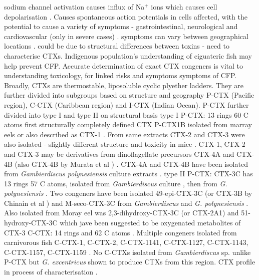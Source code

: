 \documentclass[12pt]{article}
\begin{document}
sodium channel activation causes influx of Na$^{+}$ ions which causes cell depolarisation \cite{mattei1999neurotoxins,lewis1992action,molgo2000ciguatera}.
Causes spontaneous action potentials in cells affected, with the potential to cause a variety of symptoms - gastrointestinal, neurological and cardiovascular (only in severe cases) \cite{sims1987theoretical}.
symptoms can vary between geographical locations \cite{molgo2000ciguatera,dickey2010ciguatera}. could be due to structural differences between toxins - need to characterise CTXs. Indigenous population's understanding of ciguateric fish may help prevent CFP. Accurate determination of exact CTX congeners is vital to understanding toxicology, for linked risks and symptoms symptoms of CFP.
Broadly, CTXs are thermostable, liposoluble cyclic plyether ladders. They are further divided into subgroups based on structure and geography P-CTX (Pacific region), C-CTX (Caribbean region) and I-CTX (Indian Ocean). P-CTX further divided into type I and type II on structural basis %
type I P-CTX: 13 rings 60 C atoms \cite{murata1990structures,lewis1991purification,lewis1993origin} first structurally completely defined CTX P-CTX1B isolated from marray eels \cite{murata1990structures} or also described as CTX-1 \cite{lewis1991purification}. From same extracts CTX-2 and CTX-3 were also isolated - slightly different structure and toxicity in mice \cite{lewis1991purification}. CTX-1, CTX-2 and CTX-3 may be derivatives from dinoflagellate precursors CTX-4A and CTX-4B (also GTX-4B by Murata et al \cite{murata1990structures}) \cite{lewis1993origin,yasumoto2000structural}. CTX-4A and CTX-4B have been isolated from \emph{Gambierdiscus polynesiensis} culture extracts \cite{chinain2010growth}.
type II P-CTX: CTX-3C has 13 rings 57 C atoms, isolated from \emph{Gambierdiscus} culture \cite{satake1993structure}, then from \emph{G. polynesiensis} \cite{chinain2010growth}. Two congeners have been isolated 49-epi-CTX-3C (or CTX-3B by Chinain et al \cite{chinain2010growth}) and M-seco-CTX-3C from \emph{Gambierdiscus} \cite{satake1993structure} and \emph{G. polynesiensis} \cite{chinain2010growth}. Also isolated from Moray eel was 2,3-dihydroxy-CTX-3C (or CTX-2A1) and 51-hydroxy-CTX-3C \cite{satake1998isolation} which jave been suggested to be oxygenated metabolites of CTX-3 \cite{yasumoto2000structural}
C-CTX: 14 rings and 62 C atoms \cite{vernoux1997isolation,lewis1998structure,pottier2003identification,pottier2002characterisation}. Multiple congeners isolated from carnivorous fish C-CTX-1, C-CTX-2, C-CTX-1141, C-CTX-1127, C-CTX-1143, C-CTX-1157, C-CTX-1159 \cite{vernoux1997isolation,lewis1998structure,pottier2003identification,pottier2002characterisation}. No C-CTXs isolated from \emph{Gambierdiscus} sp. unlike P-CTX but \emph{G. excentricus} shown to produce CTXs from this region. CTX profile in process of characterisation \cite{fraga2011gambierdiscus}.
\end{document}
